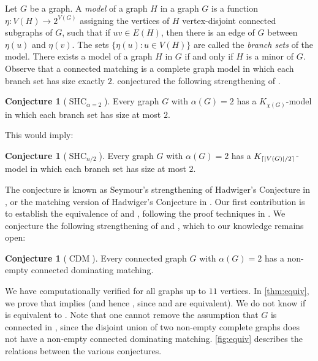 \documentclass[11pt]{article}
\numberwithin{equation}{section}
\theoremstyle{plain}
\theoremstyle{definition}
\newtheorem{conj}[thm]{Conjecture}
\DeclarePairedDelimiter{\ceil}{\lceil}{\rceil}
\DeclareMathOperator{\SHC}{SHC}
\DeclareMathOperator{\CDM}{CDM}
\newcommand{\defn}[1]{\textcolor{green!50!black}{\textit{#1}}}
\newcommand{\conjdefn}[1]{\textcolor{red!50!black}{#1}}
\begin{document}
Let $G$ be a graph. A \defn{model} of a graph $H$ in a graph $G$ is a function $\eta: V(H) \to 2^{V(G)}$ assigning the vertices of $H$ vertex-disjoint connected subgraphs of $G$, such that if $uv \in E(H)$, then there is an edge of $G$ between $\eta(u)$ and $\eta(v)$. The sets $\{\eta(u): u \in V(H)\}$ are called the \defn{branch sets} of the model. There exists a model of a graph $H$ in $G$ if and only if $H$ is a minor of $G$. Observe that a connected matching is a complete graph model in which each branch set has size exactly $2$. \citet{SeymourHC} conjectured the following strengthening of .
\begin{conj}[\conjdefn{$\SHC_{\alpha = 2}$}]
    \label{conj:shc_chi}
    Every graph $G$ with $\alpha(G) = 2$ has a $K_{\chi(G)}$-model in which each branch set has size at most $2$.
\end{conj}
This would imply:
\begin{conj}[\conjdefn{$\SHC_{n/2}$}]
    \label{conj:shc_half}
    Every graph $G$ with $\alpha(G) = 2$ has a $K_{\ceil{|V(G)|/2}}$-model in which each branch set has size at most $2$.
\end{conj}
The conjecture  is known as Seymour's strengthening of Hadwiger's Conjecture in \citep{Blasiak07}, or the matching version of Hadwiger's Conjecture in \citep{CS12}. Our first contribution is to establish the equivalence of  and , following the proof techniques in \citet{PST03}. We conjecture the following strengthening of  and , which to our knowledge remains open:
\begin{conj}[\conjdefn{$\CDM$}]
    \label{conj:cdm}
    Every connected graph $G$ with $\alpha(G) = 2$ has a non-empty connected dominating matching.
\end{conj}
\noindent
\begin{minipage}{0.38\textwidth}
    We have computationally verified  for all graphs up to $11$ vertices.
    In \cref{thm:equiv}, we prove that  implies  (and hence , since  and  are equivalent).
    We do not know if  is equivalent to .
    Note that one cannot remove the assumption that $G$ is connected in , since the disjoint union of two non-empty complete graphs does not have a non-empty connected dominating matching.
    \cref{fig:equiv} describes the relations between the various conjectures.
\end{minipage}%
\end{document}
